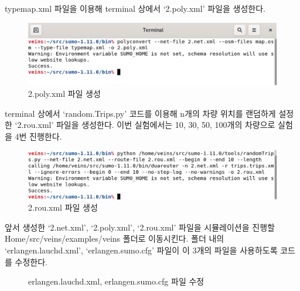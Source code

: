     typemap.xml 파일을 이용해 terminal 상에서 ‘2.poly.xml’ 파일을 생성한다.
    \vspace{-3mm}
    \begin{figure}[!h]\centering 
        \includegraphics[width=.68\textwidth]{image/week14/1-3.png}
        \caption{\footnotesize
        2.poly.xml 파일 생성}
        \vspace{-10pt}
    \end{figure}

    terminal 상에서 ‘random.Trips.py’ 코드를 이용해 n개의 차량 위치를 랜덤하게 설정한 ‘2.rou.xml’ 파일을 생성한다. 이번 실험에서는 10, 30, 50, 100개의 차량으로 실험을 4번 진행한다.
    \vspace{-3mm}
    \begin{figure}[!h]\centering 
        \includegraphics[width=.68\textwidth]{image/week14/1-4.png}
        \caption{\footnotesize
        2.rou.xml 파일 생성}
        \vspace{-10pt}
    \end{figure}
    
    앞서 생성한 ‘2.net.xml’, ‘2.poly.xml’, ‘2.rou.xml’ 파일을 시뮬레이션을 진행할 Home/src/veins/examples/veins 폴더로 이동시킨다. 폴더 내의 ‘erlangen.lauchd.xml’, ‘erlangen.sumo.cfg’ 파일이 이 3개의 파일을 사용하도록 코드를 수정한다.
    \vspace{-3mm}
    \begin{figure}[h!]
        \centering
        \hspace{3mm}
        \caption{erlangen.lauchd.xml, erlangen.sumo.cfg 파일 수정}
        \vspace{-2mm}
    \end{figure}

